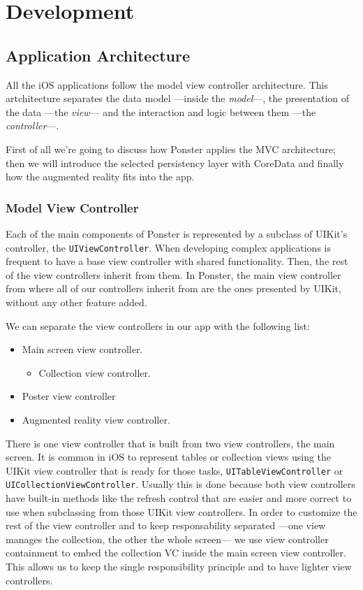 \chapter{Development}
\section{Application Architecture}
\label{sec:architecture}
All the iOS applications follow the model view controller architecture. This
artchitecture separates the data model ---inside the \emph{model}---, the presentation
of the data ---the \emph{view}--- and the interaction and logic between them ---the
\emph{controller}---. 

First of all we're going to discuss how Ponster applies the MVC
architecture; then we will introduce the selected persistency layer with CoreData
and finally how the augmented reality fits into the app.

\subsection{Model View Controller}
Each of the main components of Ponster is represented by a subclass of UIKit's
controller, the \texttt{UIViewController}. When developing complex applications is
frequent to have a base view controller with shared functionality. Then, the rest of
the view controllers inherit from them. In Ponster, the main view controller from
where all of our controllers inherit from are the ones presented by UIKit, without
any other feature added. 

We can separate the view controllers in our app with the following list:
\begin{itemize}
\item Main screen view controller.
\begin{itemize}
\item Collection view controller.
\end{itemize}
\item Poster view controller
\item Augmented reality view controller.
\end{itemize}

There is one view controller that is built from two view controllers, the main
screen. It is common in iOS to represent tables or collection views using the UIKit
view controller that is ready for those tasks, \texttt{UITableViewController} or
\texttt{UICollectionViewController}. Usually this is done because both view
controllers have built-in methods like the refresh control that are easier and
more correct to use when subclassing from those UIKit view controllers. In order to
customize the rest of the view controller and to keep responsability separated ---one
view manages the collection, the other the whole screen--- we use
view controller containment to embed the collection VC inside the main screen view
controller. This allows us to keep the single responsibility principle and to have
lighter view controllers.


